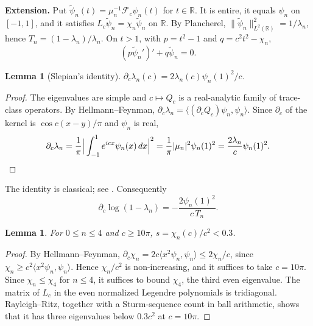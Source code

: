 \documentclass[11pt]{amsart}
\newtheorem{lemma}[proposition]{Lemma}
\theoremstyle{remark}
\numberwithin{equation}{section}
\newcommand{\R}{\mathbb{R}}
\newcommand{\F}{\mathcal{F}}
\begin{document}
\textbf{Extension.} Put $\tilde\psi_n(t)=\mu_n^{-1}\F_c\psi_n(t)$ for $t\in\R$. It is entire, it equals $\psi_n$ on $[-1,1]$, and it satisfies $L_c\tilde\psi_n=\chi_n\tilde\psi_n$ on $\R$. By Plancherel, $\|\tilde\psi_n\|^2_{L^2(\R)}=1/\lambda_n$, hence $T_n=(1-\lambda_n)/\lambda_n$. On $t>1$, with $p=t^2-1$ and $q=c^2t^2-\chi_n$,
\begin{equation}\label{eq:radial}
(p\tilde\psi_n')'+q\tilde\psi_n=0.
\end{equation}

\begin{lemma}[Slepian's identity]\label{lem:slepian}
$\partial_c\lambda_n(c)=2\lambda_n(c)\psi_n(1)^2/c$.
\end{lemma}
\begin{proof}
The eigenvalues are simple and $c\mapsto Q_c$ is a real-analytic family of trace-class operators. By Hellmann--Feynman, $\partial_c\lambda_n=\langle(\partial_cQ_c)\psi_n,\psi_n\rangle$. Since $\partial_c$ of the kernel is $\cos c(x-y)/\pi$ and $\psi_n$ is real,
\[
\partial_c\lambda_n=\frac1\pi\Big|\int_{-1}^1e^{icx}\psi_n(x)\,dx\Big|^2=\frac1\pi|\mu_n|^2\psi_n(1)^2=\frac{2\lambda_n}c\psi_n(1)^2.\qedhere
\]
\end{proof}
The identity is classical; see \cite{Fuchs64,XRY01,BonamiKaroui17}. Consequently
\begin{equation}\label{eq:dlog}
\partial_c\log(1-\lambda_n)=-\frac{2\psi_n(1)^2}{c\,T_n}.
\end{equation}

\begin{lemma}\label{lem:s}
For $0\le n\le4$ and $c\ge10\pi$, $s=\chi_n(c)/c^2<0.3$.
\end{lemma}
\begin{proof}
By Hellmann--Feynman, $\partial_c\chi_n=2c\langle x^2\psi_n,\psi_n\rangle\le2\chi_n/c$, since $\chi_n\ge c^2\langle x^2\psi_n,\psi_n\rangle$. Hence $\chi_n/c^2$ is non-increasing, and it suffices to take $c=10\pi$. Since $\chi_n\le\chi_4$ for $n\le4$, it suffices to bound $\chi_4$, the third even eigenvalue. The matrix of $L_c$ in the even normalized Legendre polynomials is tridiagonal. Rayleigh--Ritz, together with a Sturm-sequence count in ball arithmetic, shows that it has three eigenvalues below $0.3c^2$ at $c=10\pi$.
\end{proof}
\end{document}
